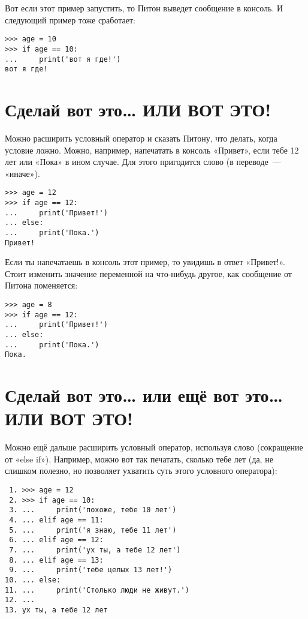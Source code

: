 Вот если этот пример запустить, то Питон выведет сообщение в консоль. И следующий пример тоже сработает:

\begin{listing}
\begin{verbatim}
>>> age = 10
>>> if age == 10:
...     print('вот я где!')
вот я где!
\end{verbatim}
\end{listing}

\section{Сделай вот это… ИЛИ ВОТ ЭТО!}

Можно расширить условный оператор и сказать Питону, что делать, когда условие ложно. Можно, например, напечатать в консоль «Привет», если тебе 12 лет или «Пока» в ином случае. Для этого пригодится слово  (в переводе — «иначе»).

\begin{listing}
\begin{verbatim}
>>> age = 12
>>> if age == 12:
...     print('Привет!')
... else:
...     print('Пока.')
Привет!
\end{verbatim}
\end{listing}

Если ты напечатаешь в консоль этот пример, то увидишь в ответ «Привет!». Стоит изменить значение переменной  на что-нибудь другое, как сообщение от Питона поменяется:

\begin{listing}
\begin{verbatim}
>>> age = 8
>>> if age == 12:
...     print('Привет!')
... else:
...     print('Пока.')
Пока.
\end{verbatim}
\end{listing}

\section{Сделай вот это… или ещё вот это… ИЛИ ВОТ ЭТО!}

Можно ещё дальше расширить условный оператор, используя слово  (сокращение от «else if»). Например, можно вот так печатать, сколько тебе лет (да, не слишком полезно, но позволяет ухватить суть этого условного оператора):

\begin{listing}
\begin{verbatim}
 1. >>> age = 12
 2. >>> if age == 10:
 3. ...     print('похоже, тебе 10 лет')
 4. ... elif age == 11:
 5. ...     print('я знаю, тебе 11 лет')
 6. ... elif age == 12:
 7. ...     print('ух ты, а тебе 12 лет')
 8. ... elif age == 13:
 9. ...     print('тебе целых 13 лет!')
10. ... else:
11. ...     print('Столько люди не живут.')
12. ...
13. ух ты, а тебе 12 лет
\end{verbatim}
\end{listing}

